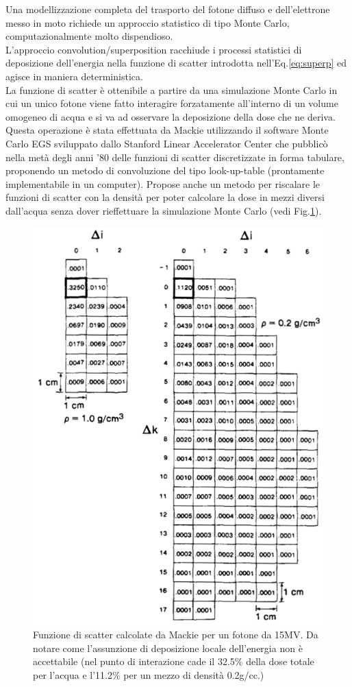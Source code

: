 {Una modellizzazione completa del trasporto del fotone diffuso e dell'elettrone messo in moto richiede un approccio statistico di tipo Monte Carlo, computazionalmente molto dispendioso.\\
L'approccio convolution/superposition racchiude i processi statistici di deposizione dell'energia nella funzione di scatter introdotta nell'Eq.\eqref{eq:superp} ed agisce in maniera deterministica.\\
La funzione di scatter è ottenibile a partire da una simulazione Monte Carlo in cui un unico fotone viene fatto interagire forzatamente all'interno di un volume omogeneo di acqua e si va ad osservare la deposizione della dose che ne deriva.\\
Questa operazione è stata effettuata da Mackie \cite{Mackie1985} utilizzando il software Monte Carlo EGS sviluppato dallo Stanford Linear Accelerator Center che pubblicò nella metà degli anni '80 delle funzioni di scatter discretizzate in forma tabulare, proponendo un metodo di convoluzione del tipo look-up-table (prontamente implementabile in un computer). Propose anche un metodo per riscalare le funzioni di scatter con la densità per poter calcolare la dose in mezzi diversi dall'acqua senza dover rieffettuare la simulazione Monte Carlo (vedi Fig.\ref{fig:mackie_kernels}).
\begin{figure}
\centering
\includegraphics[width=.8\textwidth]{./cap1/mackie_kernels.png}
\caption{Funzione di scatter calcolate da Mackie \cite{Mackie1985} per un fotone da 15MV. Da notare come l'assunzione di deposizione locale dell'energia non è accettabile (nel punto di interazione cade il 32.5\% della dose totale per l'acqua e l'11.2\% per un mezzo di densità 0.2g/cc.)}
\label{fig:mackie_kernels}
\end{figure}

}
